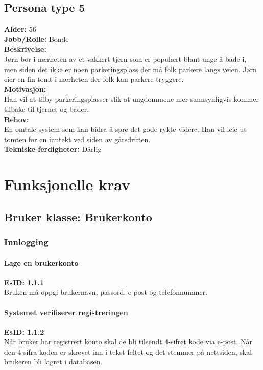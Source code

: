 \documentclass[12pt]{article}
\begin{document}
    \subsection{Persona type 5}
    \textbf{Alder:} 56\\\textbf{Jobb/Rolle:} Bonde\\\textbf{Beskrivelse:}\\Jørn bor i nærheten av et vakkert tjern som er populært blant unge å bade i, men siden det ikke er noen parkeringsplass der må folk parkere langs veien. Jørn eier en fin tomt i nærheten der folk kan parkere tryggere.\\\textbf{Motivasjon:}\\Han vil at tilby parkeringsplasser slik at ungdommene mer sannsynligvis kommer tilbake til tjernet og bader.\\\textbf{Behov:}\\En omtale system som kan bidra å spre det gode rykte videre. Han vil leie ut tomten for en inntekt ved siden av gårsdriften.\\\textbf{Tekniske ferdigheter:} Dårlig

\section{Funksjonelle krav}

    \subsection{Bruker klasse: Brukerkonto}

        \subsubsection{Innlogging}
        
            \paragraph{Lage en brukerkonto}
            \textbf{EsID: 1.1.1}\\Bruken må oppgi brukernavn, passord, e-post og telefonnummer.

            \paragraph{Systemet verifiserer registreringen}
            \textbf{EsID: 1.1.2}\\Når bruker har registrert konto skal de bli tilsendt 4-sifret kode via e-post. Når den 4-sifra koden er skrevet inn i tekst-feltet og det stemmer på nettsiden, skal brukeren bli lagret i databasen.
\end{document}
